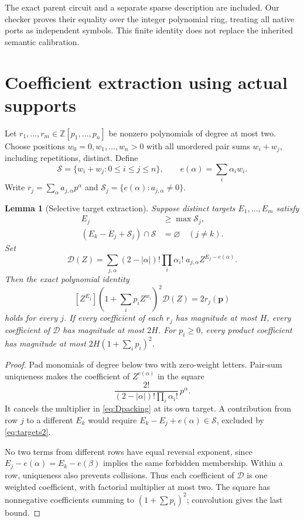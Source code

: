 \documentclass[11pt,letterpaper]{article}
\newtheorem{lemma}[theorem]{Lemma}
\theoremstyle{remark}\newtheorem{remark}[theorem]{Remark}
\newcommand{\Z}{\mathbb Z}\newcommand{\N}{\mathbb N}
\begin{document}
The exact parent circuit and a separate sparse description are included.
Our checker proves their equality over the integer polynomial ring,
treating all native ports as independent symbols. This finite identity
does not replace the inherited semantic calibration.

\section{Coefficient extraction using actual supports}\label{sec:packing}
Let $r_1,\ldots,r_m\in\Z[p_1,\ldots,p_n]$ be nonzero polynomials of degree at most two.
Choose positions $w_0=0,w_1,\ldots,w_n>0$ with all unordered pair sums
$w_i+w_j$, including repetitions, distinct. Define
\[
\mathcal S=\{w_i+w_j:0\le i\le j\le n\},\qquad
e(\alpha)=\sum_i\alpha_iw_i.
\]
Write $r_j=\sum_\alpha a_{j,\alpha}p^\alpha$ and
$\mathcal S_j=\{e(\alpha):a_{j,\alpha}\ne0\}$.

\begin{lemma}[Selective target extraction]\label{lem:extraction}
Suppose distinct targets $E_1,\ldots,E_m$ satisfy
\begin{align}
E_j&\ge\max\mathcal S_j,\label{eq:targets1}\\
(E_k-E_j+\mathcal S_j)\cap\mathcal S&=\varnothing\quad(j\ne k).
\label{eq:targets2}
\end{align}
Set
\begin{equation}\label{eq:Dpacking}
\mathcal D(Z)=\sum_{j,\alpha}
(2-|\alpha|)!\prod_i\alpha_i!\;a_{j,\alpha} Z^{E_j-e(\alpha)}.
\end{equation}
Then the exact polynomial identity
\begin{equation}\label{eq:extraction}
[Z^{E_j}]\left(1+\sum_i p_iZ^{w_i}\right)^2\mathcal D(Z)
=2r_j(\mathbf p)
\end{equation}
holds for every $j$. If every coefficient of each $r_j$ has magnitude at
most $H$, every coefficient of $\mathcal D$ has magnitude at most $2H$.
For $p_i\ge0$, every product coefficient has magnitude at most
$2H(1+\sum_i p_i)^2$.
\end{lemma}
\begin{proof}
Pad monomials of degree below two with zero-weight letters. Pair-sum
uniqueness makes the coefficient of $Z^{e(\alpha)}$ in the square
\[
\frac{2!}{(2-|\alpha|)!\prod_i\alpha_i!}\,p^\alpha.
\]
It cancels the multiplier in \eqref{eq:Dpacking} at its own target.
A contribution from row $j$ to a different $E_k$ would require
$E_k-E_j+e(\alpha)\in\mathcal S$, excluded by \eqref{eq:targets2}.

No two terms from different rows have equal reversal exponent, since
$E_j-e(\alpha)=E_k-e(\beta)$ implies the same forbidden membership.
Within a row, uniqueness also prevents collisions. Thus each coefficient
of $\mathcal D$ is one weighted coefficient, with factorial multiplier
at most two. The square has nonnegative coefficients summing to
$(1+\sum p_i)^2$; convolution gives the last bound.
\end{proof}
\end{document}
